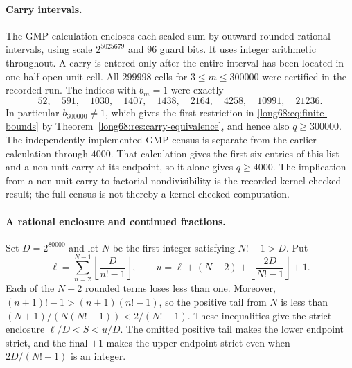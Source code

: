 \documentclass[11pt]{article}
\begin{document}
\paragraph{Carry intervals.}
The GMP calculation encloses each scaled sum by outward-rounded rational
intervals, using scale $2^{5025679}$ and $96$ guard bits. It uses integer
arithmetic throughout. A carry is entered only after the entire interval
has been located in one half-open unit cell. All $299998$ cells for
$3\le m\le300000$ were certified in the recorded run. The indices with
$b_m=1$ were exactly
\[
52,\quad591,\quad1030,\quad1407,\quad1438,\quad2164,\quad4258,
\quad10991,\quad21236.
\]
In particular $b_{300000}\ne1$, which gives the first restriction in
\eqref{long68:eq:finite-bounds} by
Theorem~\ref{long68:res:carry-equivalence}, and hence also $q\ge300000$.
The independently implemented GMP census is separate from the earlier
calculation through $4000$. That calculation gives the first six entries
of this list and a non-unit carry at its endpoint, so it alone gives
$q\ge4000$. The implication from a non-unit carry to factorial
nondivisibility is the recorded kernel-checked result; the full census
is not thereby a kernel-checked computation.

\paragraph{A rational enclosure and continued fractions.}
Set $D=2^{80000}$ and let $N$ be the first integer satisfying $N!-1>D$.
Put
\[
 \ell=\sum_{n=2}^{N-1}\left\lfloor\frac D{n!-1}\right\rfloor,
 \qquad
 u=\ell+(N-2)+\left\lfloor\frac{2D}{N!-1}\right\rfloor+1.
\]
Each of the $N-2$ rounded terms loses less than one. Moreover,
$(n+1)!-1>(n+1)(n!-1)$, so the positive tail from $N$ is less than
$(N+1)/(N(N!-1))<2/(N!-1)$. These inequalities give the strict enclosure
$\ell/D<S<u/D$. The omitted positive tail makes the lower endpoint strict,
and the final $+1$ makes the upper endpoint strict even when
$2D/(N!-1)$ is an integer.
\end{document}
